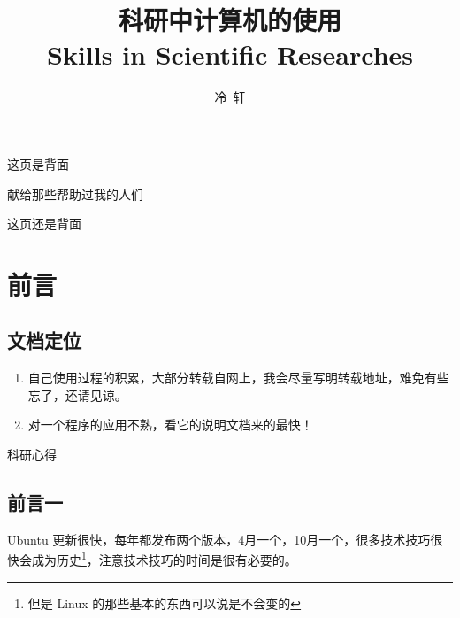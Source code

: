\documentclass[a4paper,11pt,twoside]{book}
\newcommand{\kai}{\CJKfamily{kai}}
\newcommand{\chuhao}{\fontsize{42pt}{\baselineskip}\selectfont}
\begin{document}
\title{科研中计算机的使用\\
Skills in Scientific Researches}
\author{冷\ 轩}
\maketitle



\thispagestyle{empty}
\noindent\begin{center}
这页是背面
\end{center} 


\newpage
\thispagestyle{empty}
\noindent\begin{center}
{\chuhao \kai 献给那些帮助过我的人们}
\end{center} 



\newpage
\thispagestyle{empty}
\noindent\begin{center}
这页还是背面
\end{center} 



\frontmatter
\tableofcontents  \label{content}
\newpage
\mainmatter


\chapter*{前言}
\section*{文档定位}
\begin{enumerate}
\item 自己使用过程的积累，大部分转载自网上，我会尽量写明转载地址，难免有些忘了，还请见谅。
\item 对一个程序的应用不熟，看它的说明文档来的最快！
\end{enumerate}

科研心得


\section*{前言一}
    Ubuntu 更新很快，每年都发布两个版本，4月一个，10月一个，很多技术技巧很快会成为历史\footnote{但是 Linux 的那些基本的东西可以说是不会变的}，注意技术技巧的时间是很有必要的。
\end{document}
